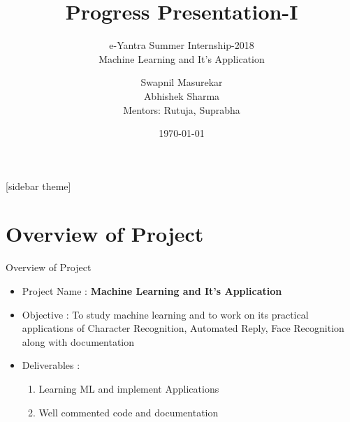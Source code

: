 \documentclass[10pt, a4paper]{beamer}
\begin{document}
	\title{Progress Presentation-I}
	\subtitle{e-Yantra Summer Internship-2018 \\Machine Learning and It's Application}
	\author{Swapnil Masurekar\\Abhishek Sharma\\
	Mentors: Rutuja, Suprabha}
	\date{\today}
	\frame{\titlepage}

[sidebar theme]
\section{Overview of Project}
\begin{frame}{Overview of Project}
	
	\begin{itemize}
		\item Project Name : \textbf{Machine Learning and It's Application}\\
		\item Objective : To study machine learning and to work on its practical applications of Character Recognition, Automated Reply, Face Recognition along with documentation\\
		\item Deliverables : 
          \begin{enumerate}
          \item Learning ML and implement Applications
          \item Well commented code and documentation\\ 
          \end{enumerate}
	\end{itemize}
\end{frame}
\end{document}
